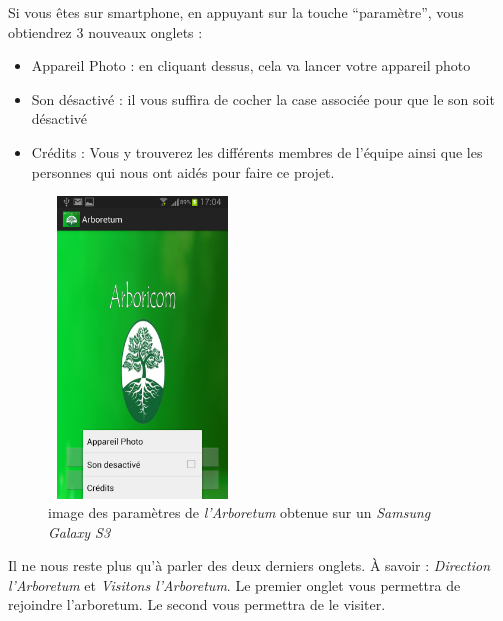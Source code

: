 \documentclass[a4paper,11pt]{article}
\begin{document}
     Si vous êtes sur smartphone, en appuyant sur la touche ``paramètre'', vous obtiendrez 3 nouveaux onglets : 
     \begin{itemize}
      \item Appareil Photo : en cliquant dessus, cela va lancer votre appareil photo 
      \item Son désactivé : il vous suffira de cocher la case associée pour que le son soit désactivé
      \item Crédits : Vous y trouverez les différents membres de l'équipe ainsi que les personnes qui nous ont aidés pour faire ce projet.
     \end{itemize}
         \begin{figure}[H]
     \begin{center}
    \includegraphics[width=5cm,height=8cm]{menuParamS3.png}
    \caption{image des paramètres de \textit{l’Arboretum} obtenue sur un \textit{Samsung Galaxy S3}}
     \end{center}
    \end{figure}

    
    Il ne nous reste plus qu'à parler des deux derniers onglets. À savoir : \textit{Direction l'Arboretum} et \textit{Visitons l'Arboretum}.
    Le premier onglet vous permettra de rejoindre l'arboretum. Le second vous permettra de le visiter.
    
\end{document}
